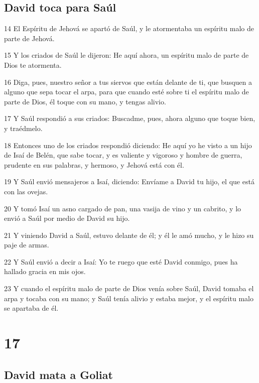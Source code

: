 \section*{David toca para Saúl}

\par 14 El Espíritu de Jehová se apartó de Saúl, y le atormentaba un espíritu malo de parte de Jehová.
\par 15 Y los criados de Saúl le dijeron: He aquí ahora, un espíritu malo de parte de Dios te atormenta.
\par 16 Diga, pues, nuestro señor a tus siervos que están delante de ti, que busquen a alguno que sepa tocar el arpa, para que cuando esté sobre ti el espíritu malo de parte de Dios, él toque con su mano, y tengas alivio.
\par 17 Y Saúl respondió a sus criados: Buscadme, pues, ahora alguno que toque bien, y traédmelo.
\par 18 Entonces uno de los criados respondió diciendo: He aquí yo he visto a un hijo de Isaí de Belén, que sabe tocar, y es valiente y vigoroso y hombre de guerra, prudente en sus palabras, y hermoso, y Jehová está con él.
\par 19 Y Saúl envió mensajeros a Isaí, diciendo: Envíame a David tu hijo, el que está con las ovejas.
\par 20 Y tomó Isaí un asno cargado de pan, una vasija de vino y un cabrito, y lo envió a Saúl por medio de David su hijo.
\par 21 Y viniendo David a Saúl, estuvo delante de él; y él le amó mucho, y le hizo su paje de armas.
\par 22 Y Saúl envió a decir a Isaí: Yo te ruego que esté David conmigo, pues ha hallado gracia en mis ojos.
\par 23 Y cuando el espíritu malo de parte de Dios venía sobre Saúl, David tomaba el arpa y tocaba con su mano; y Saúl tenía alivio y estaba mejor, y el espíritu malo se apartaba de él.

\chapter{17}

\section*{David mata a Goliat}

